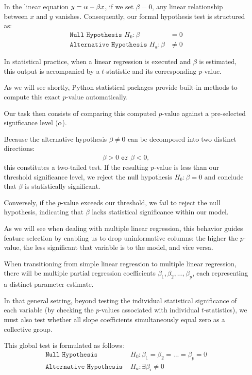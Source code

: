 In the linear equation $y = \alpha + \beta x$, if we set $\beta = 0$, any linear relationship between $x$ and $y$ vanishes. Consequently, our formal hypothesis test is structured as:
\begin{align}
	\texttt{Null Hypothesis } H_0: \beta &= 0 \\
	\texttt{Alternative Hypothesis } H_a: \beta &\neq 0
\end{align}

In statistical practice, when a linear regression is executed and $\beta$ is estimated, this output is accompanied by a $t$-statistic and its corresponding $p$-value.

As we will see shortly, Python statistical packages provide built-in methods to compute this exact $p$-value automatically.

Our task then consists of comparing this computed $p$-value against a pre-selected significance level ($\alpha$).

Because the alternative hypothesis $\beta \neq 0$ can be decomposed into two distinct directions:
\begin{align}
	\beta > 0 \texttt{ or } \beta < 0,
\end{align}
this constitutes a two-tailed test. If the resulting $p$-value is less than our threshold significance level, we reject the null hypothesis $H_0: \beta = 0$ and conclude that $\beta$ is statistically significant.

Conversely, if the $p$-value exceeds our threshold, we fail to reject the null hypothesis, indicating that $\beta$ lacks statistical significance within our model.

As we will see when dealing with multiple linear regression, this behavior guides feature selection by enabling us to drop uninformative columns: the higher the $p$-value, the less significant that variable is to the model, and vice versa.

When transitioning from simple linear regression to multiple linear regression, there will be multiple partial regression coefficients $\beta_1, \beta_2, \dots, \beta_p$, each representing a distinct parameter estimate.

In that general setting, beyond testing the individual statistical significance of each variable (by checking the $p$-values associated with individual $t$-statistics), we must also test whether all slope coefficients simultaneously equal zero as a collective group.

This global test is formulated as follows:
\begin{align}
	\texttt{Null Hypothesis } & H_0: \beta_1 = \beta_2 = \dots = \beta_p = 0 \\
	\texttt{Alternative Hypothesis } & H_a: \exists \beta_i \neq 0
\end{align}

